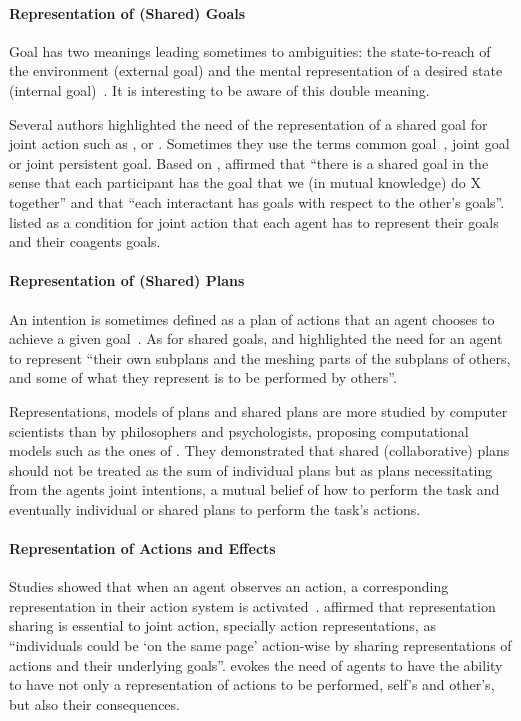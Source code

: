\documentclass[a4paper,11pt,twoside]{StyleThese}
\begin{document}
\paragraph{Representation of (Shared) Goals}
Goal has two meanings leading sometimes to ambiguities: the state-to-reach of the environment (external goal) and the mental representation of a desired state (internal goal)~\citep{tomasello_2005_understanding}. It is interesting to be aware of this double meaning. 

Several authors highlighted the need of the representation of a shared goal for joint action such as \cite{pacherie_2012_agency}, \cite{tomasello_2005_understanding} or \cite{cohen_1991_teamwork}. Sometimes they use the terms  common goal~\citep{searle_1990_collective}, joint goal or joint persistent goal.
Based on \cite{bratman_1992_coop}, \citet[p.~680]{tomasello_2005_understanding} affirmed that ``there is a shared goal in the sense that each participant has the goal that we (in mutual knowledge) do X together'' and that ``each interactant has goals with respect to the other’s goals''. \cite{pacherie_2012_agency} listed as a condition for joint action that each agent has to represent their goals and their coagents goals.

\paragraph{Representation of (Shared) Plans}
An intention is sometimes defined as a plan of actions that an agent chooses to achieve a given goal~\citep{tomasello_2005_understanding, kaplan_2006_challenges}. 
As for shared goals, \cite{tomasello_2005_understanding} and \citet[p.~353]{pacherie_2012_agency} highlighted the need for an agent to represent ``their own subplans and the meshing parts of the subplans of others, and some of what they represent is to be performed by others''.

Representations, models of plans and shared plans are more studied by computer scientists than by philosophers and psychologists, proposing computational models such as the ones of \cite{grosz_1996_collaborative}. They demonstrated that shared (collaborative) plans should not be treated as the sum of individual plans but as plans necessitating from the agents joint intentions, a mutual belief of how to perform the task and eventually individual or shared plans to perform the task's actions.

\paragraph{Representation of Actions and Effects}
Studies showed that when an agent observes an action, a corresponding representation in their action system is activated~\citep{rizzolatti_2004_mirror}. \citet[p.~71]{sebanz_2006_joint} affirmed that representation sharing is essential to joint action, specially action representations, as ``individuals could be ‘on the same page’ action-wise by sharing representations of actions and their underlying goals''. \cite{pacherie_2012_agency} evokes the need of agents to have the ability to have not only a representation of actions to be performed, self's and other's, but also their consequences. 
\end{document}
